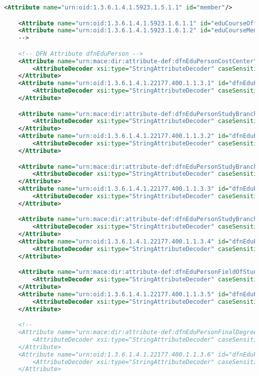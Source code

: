 \begin{lstlisting}[language=xml]
    <Attribute name="urn:oid:1.3.6.1.4.1.5923.1.5.1.1" id="member"/>

    <Attribute name="urn:oid:1.3.6.1.4.1.5923.1.6.1.1" id="eduCourseOffering"/>
    <Attribute name="urn:oid:1.3.6.1.4.1.5923.1.6.1.2" id="eduCourseMember"/>
    -->

    <!-- DFN Attribute dfnEduPerson -->
    <Attribute name="urn:mace:dir:attribute-def:dfnEduPersonCostCenter" id="dfnEduPersonCostCenter">
        <AttributeDecoder xsi:type="StringAttributeDecoder" caseSensitive="false"/>
    </Attribute>
    <Attribute name="urn:oid:1.3.6.1.4.1.22177.400.1.1.3.1" id="dfnEduPersonCostCenter">
        <AttributeDecoder xsi:type="StringAttributeDecoder" caseSensitive="false"/>
    </Attribute>

    <Attribute name="urn:mace:dir:attribute-def:dfnEduPersonStudyBranch1" id="dfnEduPersonStudyBranch1">
        <AttributeDecoder xsi:type="StringAttributeDecoder" caseSensitive="false"/>
    </Attribute>
    <Attribute name="urn:oid:1.3.6.1.4.1.22177.400.1.1.3.2" id="dfnEduPersonStudyBranch1">
        <AttributeDecoder xsi:type="StringAttributeDecoder" caseSensitive="false"/>
    </Attribute>

    <Attribute name="urn:mace:dir:attribute-def:dfnEduPersonStudyBranch2" id="dfnEduPersonStudyBranch2">
        <AttributeDecoder xsi:type="StringAttributeDecoder" caseSensitive="false"/>
    </Attribute>
    <Attribute name="urn:oid:1.3.6.1.4.1.22177.400.1.1.3.3" id="dfnEduPersonStudyBranch2">
        <AttributeDecoder xsi:type="StringAttributeDecoder" caseSensitive="false"/>
    </Attribute>

    <Attribute name="urn:mace:dir:attribute-def:dfnEduPersonStudyBranch3" id="dfnEduPersonStudyBranch3">
        <AttributeDecoder xsi:type="StringAttributeDecoder" caseSensitive="false"/>
    </Attribute>
    <Attribute name="urn:oid:1.3.6.1.4.1.22177.400.1.1.3.4" id="dfnEduPersonStudyBranch3">
        <AttributeDecoder xsi:type="StringAttributeDecoder" caseSensitive="false"/>
    </Attribute>

    <Attribute name="urn:mace:dir:attribute-def:dfnEduPersonFieldOfStudyString" id="dfnEduPersonFieldOfStudyString">
        <AttributeDecoder xsi:type="StringAttributeDecoder" caseSensitive="false"/>
    </Attribute>
    <Attribute name="urn:oid:1.3.6.1.4.1.22177.400.1.1.3.5" id="dfnEduPersonFieldOfStudyString">
        <AttributeDecoder xsi:type="StringAttributeDecoder" caseSensitive="false"/>
    </Attribute>

    <!--
    <Attribute name="urn:mace:dir:attribute-def:dfnEduPersonFinalDegree" id="dfnEduPersonFinalDegree">
        <AttributeDecoder xsi:type="StringAttributeDecoder" caseSensitive="false"/>
    </Attribute>
    <Attribute name="urn:oid:1.3.6.1.4.1.22177.400.1.1.3.6" id="dfnEduPersonFinalDegree">
        <AttributeDecoder xsi:type="StringAttributeDecoder" caseSensitive="false"/>
    </Attribute>


\end{lstlisting}
